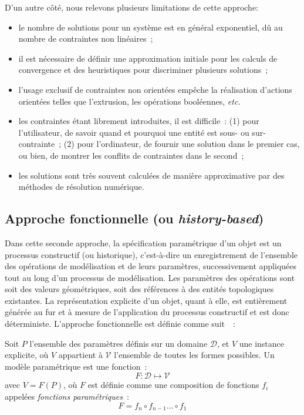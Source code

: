D'un autre côté, nous relevons plusieurs limitations de cette approche: %
\begin{itemize}
	\item le nombre de solutions pour un système est en général exponentiel, dû
	      au nombre de contraintes non linéaires~; %
	\item il est nécessaire de définir une approximation initiale pour les calculs
	      de convergence et des heuristiques pour discriminer plusieurs solutions~;
	\item l'usage exclusif de contraintes non orientées empêche la réalisation
	      d'actions orientées telles que l'extrusion, les opérations booléennes, \textit{etc.}
	\item les contraintes étant librement introduites, il est difficile~: (1) pour
	      l'utilisateur, de savoir quand et pourquoi une entité est sous- ou
	      sur-contrainte~; (2) pour l'ordinateur, de fournir une solution dans le
	      premier cas, ou bien, de montrer les conflits de contraintes dans le
	      second~;
	\item les solutions sont très souvent calculées de manière approximative par
	      des méthodes de résolution numérique.
\end{itemize}

\subsection{Approche fonctionnelle (ou \textit{history-based})}
\label{sec:etat-art-modelisation-parametric-approche-fonctionnelle}

Dans cette seconde approche, la spécification paramétrique d'un objet est un
processus constructif (ou historique), c'est-à-dire un enregistrement de
l'ensemble des opérations de modélisation et de leurs paramètres, successivement
appliquées tout au long d'un processus de modélisation. %
Les paramètres des opérations sont soit des valeurs géométriques, soit des références à des entités topologiques existantes. %
La représentation explicite d'un objet, quant à elle, est entièrement générée au fur et à mesure de l'application du processus constructif et est donc déterministe. %
L'approche fonctionnelle est définie comme suit~\cite{pierra1996general}~: %
\begin{definition}
	Soit $P$ l'ensemble des paramètres définis sur un domaine $\mathcal{D}$, et $V$ une instance explicite, où $V$ appartient à $\mathcal{V}$ l'ensemble de toutes les formes possibles.
	Un modèle paramétrique est une fonction~:
	\[F : \mathcal{D} \mapsto \mathcal{V}\] %
	avec $V = F(P)$, où $F$ est définie comme une composition de
	fonctions $f_{i}$ appelées \emph{fonctions paramétriques}~: \[F = f_{n}\circ f_{n-1} \ldots \circ f_{1}\] %
\end{definition}

